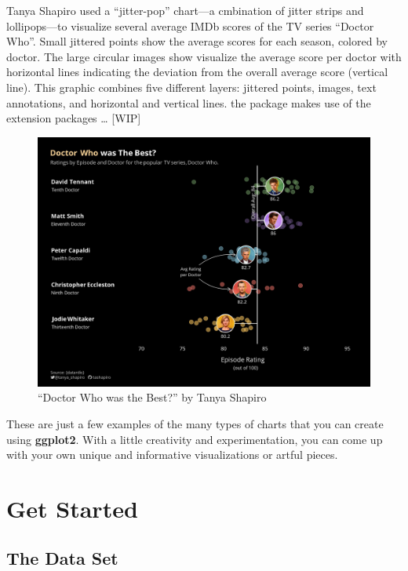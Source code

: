 \documentclass[
]{krantz}
\begin{document}
Tanya Shapiro used a ``jitter-pop'' chart---a cmbination of jitter strips and lollipops---to visualize several average IMDb scores of the TV series ``Doctor Who''. Small jittered points show the average scores for each season, colored by doctor. The large circular images show visualize the average score per doctor with horizontal lines indicating the deviation from the overall average score (vertical line). This graphic combines five different layers: jittered points, images, text annotations, and horizontal and vertical lines. the package makes use of the extension packages \ldots{} {[}WIP{]}

\begin{figure}
\centering
\includegraphics{./img/doctor-who-tanya-shapiro.png}
\caption{\label{fig:02imgVizDoctorWho}``Doctor Who was the Best?'' by Tanya Shapiro}
\end{figure}

These are just a few examples of the many types of charts that you can create using \textbf{ggplot2}. With a little creativity and experimentation, you can come up with your own unique and informative visualizations or artful pieces.

\hypertarget{get-started}{%
\chapter{Get Started}\label{get-started}}

\hypertarget{dataset}{%
\section{The Data Set}\label{dataset}}
\end{document}
